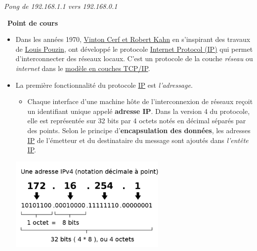 \documentclass[
  11pt,
]{article}
\providecommand{\tightlist}{%
  \setlength{\itemsep}{0pt}\setlength{\parskip}{0pt}}
\newcounter{cours}
\newenvironment{cours}[1]
{\par \medskip   \addtocounter{cours}{1} \noindent  
\begin{bclogo}[arrondi =0.1,  ombre = true, barre=none, logo=\bcbook, marge=4]{~\textbf{Point de cours} \textbf{\thecours} {\itshape #1} }  \par}
{
\end{bclogo}
 \par \bigskip }
\begin{document}
\emph{Pong de 192.168.1.1 vers 192.168.0.1}

\begin{cours}{}

\begin{itemize}
\item
  Dans les années 1970,
  \href{https://fr.wikipedia.org/wiki/Vint_Cerf}{Vinton Cerf et Robert
  Kahn} en s'inspirant des travaux de
  \href{https://interstices.info/louis-pouzin-la-tete-dans-les-reseaux/}{Louis
  Pouzin}, ont développé le protocole
  \href{https://fr.wikipedia.org/wiki/Internet_Protocol}{Internet
  Protocol (IP)} qui permet d'interconnecter des réseaux locaux. C'est
  un protocole de la couche \emph{réseau} ou \emph{internet} dans le
  \href{https://fr.wikipedia.org/wiki/Suite_des_protocoles_Internet}{modèle
  en couches TCP/IP}.
\item
  La première fonctionnalité du protocole
  \href{https://fr.wikipedia.org/wiki/Internet_Protocol}{IP} est
  \emph{l'adressage}.

  \begin{itemize}
  \tightlist
  \item
    Chaque interface d'une machine hôte de l'interconnexion de réseaux
    reçoit un identifiant unique appelé \textbf{adresse IP}. Dans la
    version 4 du protocole, elle est représentée sur 32 bits par 4
    octets notés en décimal séparés par des points. Selon le principe
    d'\textbf{encapsulation des données}, les adresses
    \href{https://fr.wikipedia.org/wiki/Internet_Protocol}{IP} de
    l'émetteur et du destinataire du message sont ajoutés dans
    \emph{l'entête}
    \href{https://fr.wikipedia.org/wiki/Internet_Protocol}{IP}.
  \end{itemize}

  \href{https://commons.wikimedia.org/wiki/File:Addresse_Ipv4.svg}{\includegraphics[width=0.6\textwidth,height=\textheight]{images/750px-Addresse_Ipv4_svg.png}}


\end{itemize}
\end{cours}
\end{document}
